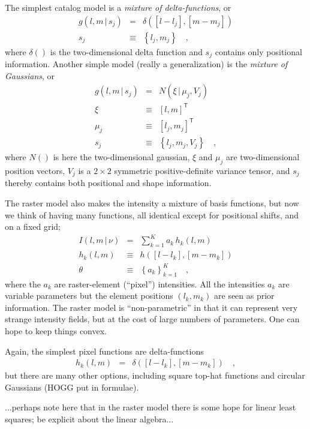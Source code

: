 \documentclass[12pt]{article}
\newcommand{\set}[1]{\left\{{#1}\right\}}
\newcommand{\given}{\,|\,}
\newcommand{\normal}{N}
\newcommand{\transpose}[1]{{#1}^{\!\mathsf{T}}}
\begin{document}
The simplest catalog model is a \emph{mixture of delta-functions}, or
\begin{eqnarray}
g(l,m\given s_j) &=& \delta([l-l_j], [m-m_j])
\\
s_j &\equiv& \set{l_j, m_j}
\quad,
\end{eqnarray}
where $\delta()$ is the two-dimensional delta function and $s_j$
contains only positional information.  Another simple model (really a
generalization) is the \emph{mixture of Gaussians}, or
\begin{eqnarray}
g(l,m\given s_j) &=& \normal(\xi\given\mu_j,V_j)
\\
\xi &\equiv& \transpose{[l, m]}
\\
\mu_j &\equiv& \transpose{[l_j, m_j]}
\\
s_j &\equiv& \set{l_j, m_j, V_j}
\quad,
\end{eqnarray}
where $\normal()$ is here the two-dimensional gaussian, $\xi$ and
$\mu_j$ are two-dimensional position vectors, $V_j$ is a $2\times 2$
symmetric positive-definite variance tensor, and $s_j$ thereby
contains both positional and shape information.

The raster model also makes the intensity a mixture of basis
functions, but now we think of having many functions, all identical
except for positional shifts, and on a fixed grid;
\begin{eqnarray}
I(l,m\given\nu) &=& \sum_{k=1}^K a_k\,h_k(l,m)
\\
h_k(l,m) &\equiv& h([l-l_k], [m-m_k])
\\
\theta &\equiv& \set{a_k}_{k=1}^K
\quad,
\end{eqnarray}
where the $a_k$ are raster-element (``pixel'') intensities.  All the
intensities $a_k$ are variable parameters but the element positions
$(l_k, m_k)$ are seen as prior information.  The raster model is
``non-parametric'' in that it can represent very strange intensity
fields, but at the cost of large numbers of parameters.  One can hope
to keep things convex.

Again, the simplest pixel functions are delta-functions
\begin{eqnarray}
h_k(l,m) &=& \delta([l-l_k], [m-m_k])
\quad,
\end{eqnarray}
but there are many other options, including square top-hat functions
and circular Gaussians (HOGG put in formulae).

...perhaps note here that in the raster model there is some hope for
linear least squares; be explicit about the linear algebra...
\end{document}
